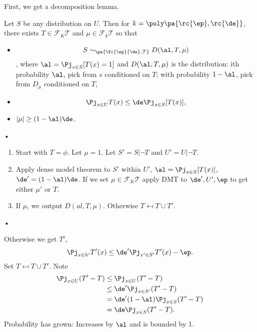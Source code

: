 First, we get a decomposition lemma.
\begin{lem}
Let $S$ be any distribution on $U$. Then for $k=\poly\pa{\rc{\ep},\rc{\de}}$, there exists $T\in \mathcal F_K\mathcal T$ and $\mu\in \mathcal F_k \mathcal T$ so that
\begin{itemize}
\item
 $$S\sim_{\pa{\fc{\ep}{\de}, \mathcal  T}} D(\al, T, \mu)$$, where  $\al=\Pj_{x\in S} [T(x)=1]$ and $D(\al,T,\mu)$ is the distribution: ith probability $\al$, pick from $s$ conditioned on $T$; with probability $1-\al$, pick from $D_\mu$ 
 conditioned on $T$,
 \item
$$
\Pj_{x\in %
U} T(x)\le \de \Pj_{x\in S}[T(x)],
$$
\item
$|\mu|\ge (1-\al)\de$.
\end{itemize}•
\end{lem}


\begin{enumerate}
\item
Start with $T=\phi$. Let $\mu=1$. Let $S'=S|\neg T$ and $U' = U|\neg T$. 
\item
Apply dense model theorem to $S'$ within $U'$, $\al=\Pj_{x\in S} [T(x)]$, $\de'=(1-\al)\de$. If we set $\mu\in \mathcal F_K \mathcal T$ %
apply DMT to $\de',U', \ep$ to get %
 either  $\mu'$ or $T$.
\item
If $\mu$, we output $D(al, T,\mu)$. Otherwise $T\mapsfrom T\cup T'$.
\end{enumerate}•


Otherwise we get $T'$,
$$
\Pj_{x\in h'}T'(x) \le \de' \Pj_{x'\in S'} T'(x) - \ep.
$$ 
Set $T\mapsfrom T\cup T'$.
Note 
\begin{align}
\Pj_{x\in U}(T'-T)&\le \Pj_{x\in U}(T'-T)\\
&\le \de' \Pj_{x\in S'} (T'-T)\\
&=\de'(1-\al)\Pj_{x\in S} (T'-T)\\
&=\de \Pj_{x\in S} (T'-T).
\end{align}
Probability has grown: Increases by $\al$ and is bounded by 1.

